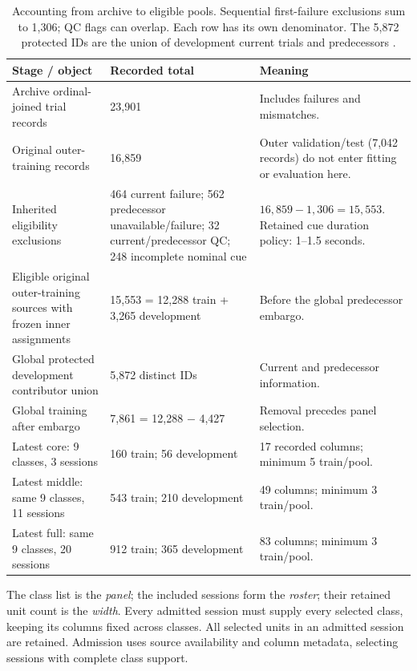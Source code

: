 \documentclass[10pt,a4paper]{article}
\begin{document}
\begin{table}[h!]
\caption{Accounting from archive to eligible pools. Sequential first-failure exclusions sum to 1,306; QC flags can overlap. Each row has its own denominator. The 5,872 protected IDs are the union of development current trials and predecessors \cite{compact,selection,latest}.}
\label{tab:eligibility}\small
\begin{tabularx}{\linewidth}{L{59mm}L{38mm}Y}
\toprule
Stage / object & Recorded total & Meaning \\
\midrule
Archive ordinal-joined trial records & 23,901 & Includes failures and mismatches. \\
Original outer-training records & 16,859 & Outer validation/test (7,042 records) do not enter fitting or evaluation here. \\
Inherited eligibility exclusions & 464 current failure; 562 predecessor unavailable/failure; 32 current/predecessor QC; 248 incomplete nominal cue & $16{,}859-1{,}306=15{,}553$. Retained cue duration policy: 1--1.5 seconds. \\
Eligible original outer-training sources with frozen inner assignments & 15,553 = 12,288 train + 3,265 development & Before the global predecessor embargo. \\
Global protected development contributor union & 5,872 distinct IDs & Current and predecessor information. \\
Global training after embargo & 7,861 = 12,288 $-$ 4,427 & Removal precedes panel selection. \\
Latest core: 9 classes, 3 sessions & 160 train; 56 development & 17 recorded columns; minimum 5 train/pool. \\
Latest middle: same 9 classes, 11 sessions & 543 train; 210 development & 49 columns; minimum 3 train/pool. \\
Latest full: same 9 classes, 20 sessions & 912 train; 365 development & 83 columns; minimum 3 train/pool. \\
\bottomrule
\end{tabularx}
\end{table}

The class list is the \emph{panel}; the included sessions form the \emph{roster}; their retained unit count is the \emph{width}. Every admitted session must supply every selected class, keeping its columns fixed across classes. All selected units in an admitted session are retained. Admission uses source availability and column metadata, selecting sessions with complete class support.
\end{document}
